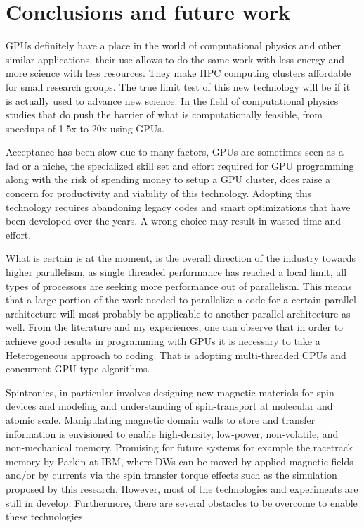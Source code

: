 
\chapter{Conclusions and future work} %

\label{Conclusions and future work} %


GPUs definitely have a place in the world of computational physics and other similar applications, their use allows to do the same work with less energy and more science with less resources. They make HPC computing clusters affordable for small research groups. The true limit test of this new technology will be if it is actually used to advance new science. In the field of computational physics studies that do push the barrier of what is computationally feasible, from speedups of 1.5x to 20x using GPUs\cite{applications}.

Acceptance has been slow due to many factors, GPUs are sometimes seen as a fad or a niche, the specialized skill set and effort required for GPU programming along with the risk of spending money to setup a GPU cluster, does raise a concern for productivity and viability of this technology. Adopting this technology requires abandoning legacy codes and smart optimizations that have been developed over the years. A wrong choice may result in wasted time and effort.

What is certain is at the moment, is the overall direction of the industry towards higher parallelism, as single threaded performance has reached a local limit, all types of processors are seeking more performance out of parallelism. This means that a large portion of the work needed to parallelize a code for a certain parallel architecture will most probably be applicable to another parallel architecture as well. From the literature and my experiences, one can observe that in order to achieve good results in programming with GPUs it is necessary to take a Heterogeneous approach to coding. That is adopting multi-threaded CPUs and concurrent GPU type algorithms.

Spintronics, in particular involves designing new magnetic materials for spin-devices and modeling and understanding of spin-transport at molecular and atomic scale. Manipulating magnetic domain walls to store and transfer information is envisioned to enable high-density, low-power, non-volatile, and non-mechanical memory. Promising for future systems for example the racetrack memory by Parkin at IBM, where DWs can be moved by applied magnetic fields and/or by currents via the spin transfer torque effects such as the simulation proposed by this research. However, most of the technologies and experiments  are still in develop. Furthermore, there are several obstacles to be overcome to enable these technologies.

